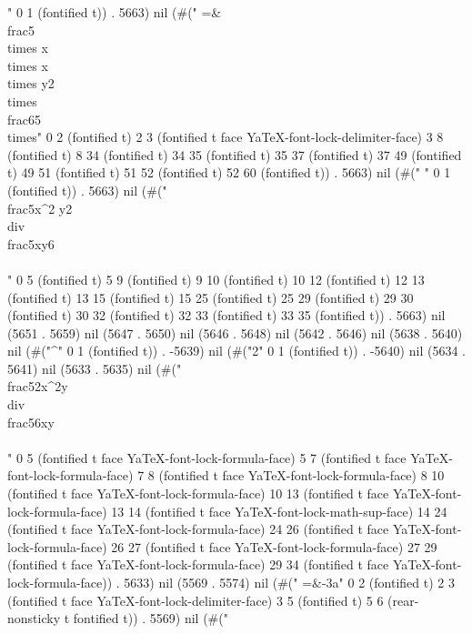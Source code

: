 " 0 1 (fontified t)) . 5663) nil (#("	=&\\frac{5\\times x\\times x\\times y}{2}\\times\\frac{6}{5\\times" 0 2 (fontified t) 2 3 (fontified t face YaTeX-font-lock-delimiter-face) 3 8 (fontified t) 8 34 (fontified t) 34 35 (fontified t) 35 37 (fontified t) 37 49 (fontified t) 49 51 (fontified t) 51 52 (fontified t) 52 60 (fontified t)) . 5663) nil (#("
" 0 1 (fontified t)) . 5663) nil (#("\\frac{5x^2 y}{2}\\div\\frac{5xy}{6}\\\\" 0 5 (fontified t) 5 9 (fontified t) 9 10 (fontified t) 10 12 (fontified t) 12 13 (fontified t) 13 15 (fontified t) 15 25 (fontified t) 25 29 (fontified t) 29 30 (fontified t) 30 32 (fontified t) 32 33 (fontified t) 33 35 (fontified t)) . 5663) nil (5651 . 5659) nil (5647 . 5650) nil (5646 . 5648) nil (5642 . 5646) nil (5638 . 5640) nil (#("^" 0 1 (fontified t)) . -5639) nil (#("2" 0 1 (fontified t)) . -5640) nil (5634 . 5641) nil (5633 . 5635) nil (#("\\frac{5}{2}x^2y\\div\\frac{5}{6}xy\\\\" 0 5 (fontified t face YaTeX-font-lock-formula-face) 5 7 (fontified t face YaTeX-font-lock-formula-face) 7 8 (fontified t face YaTeX-font-lock-formula-face) 8 10 (fontified t face YaTeX-font-lock-formula-face) 10 13 (fontified t face YaTeX-font-lock-formula-face) 13 14 (fontified t face YaTeX-font-lock-math-sup-face) 14 24 (fontified t face YaTeX-font-lock-formula-face) 24 26 (fontified t face YaTeX-font-lock-formula-face) 26 27 (fontified t face YaTeX-font-lock-formula-face) 27 29 (fontified t face YaTeX-font-lock-formula-face) 29 34 (fontified t face YaTeX-font-lock-formula-face)) . 5633) nil (5569 . 5574) nil (#("	=&-3a" 0 2 (fontified t) 2 3 (fontified t face YaTeX-font-lock-delimiter-face) 3 5 (fontified t) 5 6 (rear-nonsticky t fontified t)) . 5569) nil (#("
}
